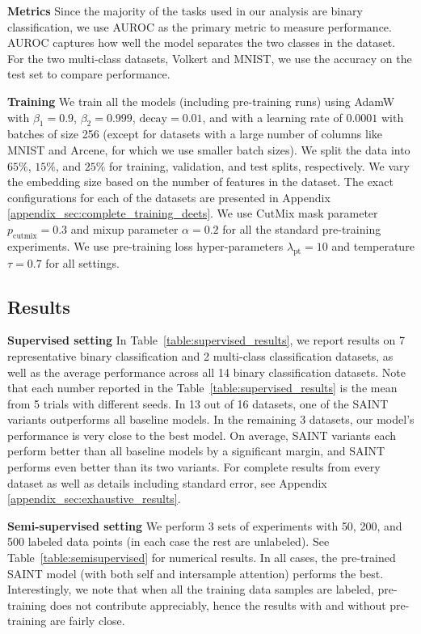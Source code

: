 \textbf{Metrics} Since the majority of the tasks used in our analysis are binary classification, we use AUROC as the primary metric to measure performance. AUROC captures how well the model separates the two classes in the dataset. For the two multi-class datasets, Volkert and MNIST, we use the accuracy on the test set to compare performance.

\textbf{Training} We train all the models (including pre-training runs) using AdamW with $\beta_1 = 0.9$, $\beta_2 = 0.999$, $\text{decay} = 0.01$, and with a learning rate of $0.0001$ with batches of size 256 (except for datasets with a large number of columns like MNIST and Arcene, for which we use smaller batch sizes). We split the data into $65\%$, $15\%$, and $25\%$ for training, validation, and test splits, respectively. We vary the embedding size based on the number of features in the dataset. The exact configurations for each of the datasets are presented in Appendix \ref{appendix_sec:complete_training_deets}. We use CutMix mask parameter $p_{\text{cutmix}} = 0.3$ and mixup parameter $\alpha=0.2$ for all the standard pre-training experiments. We use pre-training loss hyper-parameters $\lambda_{\text{pt}} = 10$ and temperature $\tau = 0.7$ for all settings. 

\subsection{Results}
\label{subsec:main_results}

\textbf{Supervised setting} In Table~\ref{table:supervised_results}, we report results on 7 representative binary classification and 2 multi-class classification datasets, as well as the average performance across all 14 binary classification datasets. Note that each number reported in the Table~\ref{table:supervised_results} is the mean from 5 trials with different seeds. In 13 out of 16 datasets, one of the SAINT variants outperforms all baseline models. In the remaining 3 datasets, our model's performance is very close to the best model. On average, SAINT variants each perform better than all baseline models by a significant margin, and SAINT performs even better than its two variants. For complete results from every dataset as well as details including standard error, see Appendix \ref{appendix_sec:exhaustive_results}.

\textbf{Semi-supervised setting}  We perform 3 sets of experiments with 50, 200, and 500 labeled data points (in each case the rest are unlabeled). See Table~\ref{table:semisupervised} for numerical results. In all cases, the pre-trained SAINT model (with both self and intersample attention) performs the best. Interestingly, we note that when all the training data samples are labeled, pre-training does not contribute appreciably, hence the results with and without pre-training are fairly close. 

